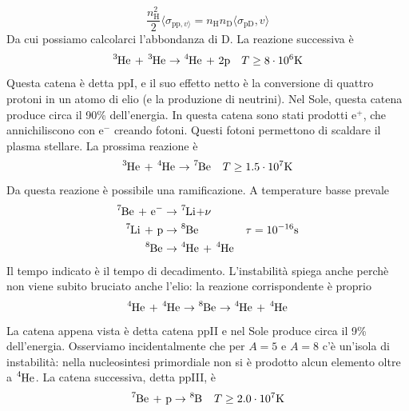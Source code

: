 \documentclass[a4paper,11pt]{article}
\theoremstyle{theorem}
\theoremstyle{definition}
\begin{document}
\begin{itemize}
		\[\frac{n_\mathrm{H}^2}{2}\langle\sigma_{\mathrm{pp},v\rangle}=n_\mathrm{H}n_\mathrm{D}\langle\sigma_\mathrm{pD},v\rangle\]
		Da cui possiamo calcolarci l'abbondanza di D. La reazione successiva è
		\begin{align*}
		\tensor[^3]{\mathrm{He}}{}\textrm{ + }\tensor[^3]{\mathrm{He}}{}&\rightarrow\tensor[^4]{\mathrm{He}}{}\textrm{ + 2p}&T\geq 8\cdot 10^6\mathrm{ K}
		\end{align*}
		Questa catena è detta ppI, e il suo effetto netto è la conversione di quattro protoni in un atomo di elio (e la produzione di neutrini). Nel Sole, questa catena produce circa il 90\% dell'energia. In questa catena sono stati prodotti e$^+$, che annichiliscono con e$^-$ creando fotoni. Questi fotoni permettono di scaldare il plasma stellare. La prossima reazione è
		\begin{align*}
		\tensor[^3]{\mathrm{He}}{}\textrm{ + }\tensor[^4]{\mathrm{He}}{}&\rightarrow\tensor[^7]{\mathrm{Be}}{}&T\geq 1.5\cdot 10^7\mathrm{ K}
		\end{align*}
		Da questa reazione è possibile una ramificazione. A temperature basse prevale
		\begin{align*}
		\tensor[^7]{\mathrm{Be}}{}\textrm{ + e$^-$}&\rightarrow\tensor[^7]{\mathrm{Li}}{}\mathrm{ + }\nu\\
		\tensor[^7]{\mathrm{Li}}{}\textrm{ + p}&\rightarrow\tensor[^8]{\mathrm{Be}}{}&\tau=10^{-16}\mathrm{ s}\\
		\tensor[^8]{\mathrm{Be}}{}&\rightarrow\tensor[^4]{\mathrm{He}}{}\textrm{ + }\tensor[^4]{\mathrm{He}}{}
		\end{align*}
		Il tempo indicato è il tempo di decadimento. L'instabilità spiega anche perchè non viene subito bruciato anche l'elio: la reazione corrispondente è proprio
		\begin{align*}
			\tensor[^4]{\mathrm{He}}{}\textrm{ + }\tensor[^4]{\mathrm{He}}{}\rightarrow\tensor[^8]{\mathrm{Be}}{}\rightarrow\tensor[^4]{\mathrm{He}}{}\textrm{ + }\tensor[^4]{\mathrm{He}}{}
		\end{align*}
		La catena appena vista è detta catena ppII e nel Sole produce circa il 9\% dell'energia. Osserviamo incidentalmente che per $A=5$ e $A=8$ c'è un'isola di instabilità: nella nucleosintesi primordiale non si è prodotto alcun elemento oltre a $\tensor[^4]{\mathrm{He}}{}$. La catena successiva, detta ppIII, è
		\begin{align*}\tensor[^7]{\mathrm{Be}}{}\textrm{ + p}&\rightarrow\tensor[^8]{\mathrm{B}}{}&T\geq 2.0\cdot10^7\mathrm{ K}\\

\end{align*}
\end{itemize}
\end{document}
